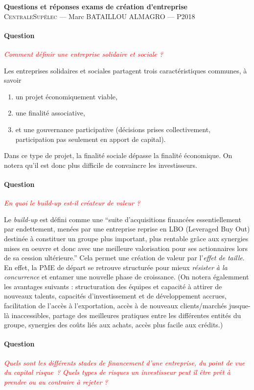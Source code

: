 \documentclass[12pt,oneside,a4paper]{article}
\newcommand{\question}[1]
{
\addtocounter{section}{1}
\paragraph*{Question \thesection}
\emph{\textcolor{red}{#1}}
}
\begin{document}
\begin{center}
{\LARGE \bfseries 
 Questions et réponses exams de création d'entreprise \\[0.3cm] 
}
{\large
  \textsc{CentraleSupélec} --- Marc BATAILLOU ALMAGRO --- P2018\\[0.7cm]
}
\end{center}
\question{Comment définir une entreprise solidaire et sociale ?}
Les entreprises solidaires et sociales partagent trois caractéristiques communes, à savoir
\begin{enumerate}
  \item un projet économiquement viable,
  \item une finalité associative,
  \item et une gouvernance participative (décisions prises collectivement, participation pas seulement en apport de capital).
\end{enumerate}
Dans ce type de projet, la finalité sociale dépasse la finalité économique.
On notera qu'il est donc plus difficile de convaincre les investisseurs.
  
\question{En quoi le build-up est-il créateur de valeur ?}
Le \emph{build-up} est défini comme une ``suite d'acquisitions financées essentiellement
par endettement, menées par une entreprise reprise en LBO (Leveraged Buy Out) destinée 
à constituer un groupe plus important, plus rentable grâce aux synergies mises en oeuvre 
et donc avec une meilleure valorisation pour ses actionnaires lors de sa cession ultérieure.''
Cela permet une création de valeur par l'\emph{effet de taille}.
En effet, la PME de départ se retrouve structurée 
pour mieux \emph{résister à la concurrence} et entamer une nouvelle phase de croissance.
(On notera égalemment les avantages suivants : 
structuration des équipes et capacité à attirer de nouveaux talents,
capacités d’investissement et de développement accrues,
facilitation de l’accès à l’exportation, 
accès à de nouveaux clients/marchés jusque-là inaccessibles,
partage des meilleures pratiques entre les différentes entités du groupe,
synergies des coûts liés aux achats, accès plus facile aux crédits.)
  

\question{Quels sont les différents stades de financement d’une entreprise, du point de vue du capital risque ? Quels types de risques un investisseur peut il être prêt à prendre ou au contraire à rejeter ?}
\end{document}
